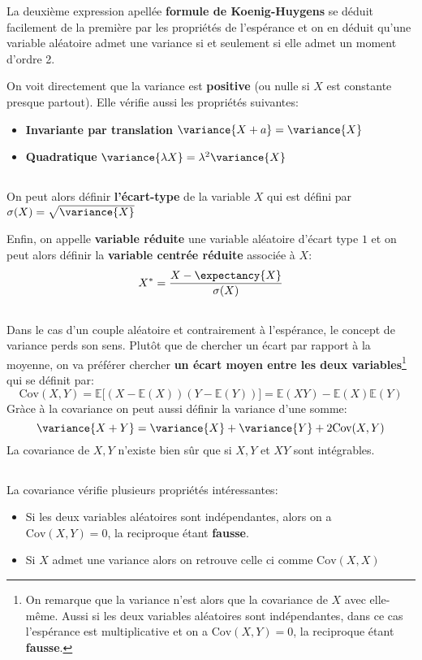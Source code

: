 La deuxième expression apellée \textbf{formule de Koenig-Huygens} se déduit facilement de la première par les propriétés de l'espérance et on en déduit qu'une variable aléatoire admet une variance si et seulement si elle admet un moment d'ordre 2.

On voit directement que la variance est \textbf{positive} (ou nulle si \(X\) est constante presque partout). Elle vérifie aussi les propriétés suivantes:
\begin{itemize}
   \item \textbf{Invariante par translation} \( \variance{X + a} = \variance{X} \)
   \item \textbf{Quadratique}  \( \variance{ \lambda X} = \lambda^2\variance{X} \)
\end{itemize}
\subsection*{}
On peut alors définir \textbf{l'écart-type} de la variable \(X\) qui est défini par \(\sigma(X) = \sqrt{\variance{X}}\)\<

Enfin, on appelle \textbf{variable réduite} une variable aléatoire d'écart type \(1\) et on peut alors définir la \textbf{variable centrée réduite} associée à \(X\):
\[
   X^*= \frac{X - \expectancy{X}}{\sigma(X)}  
\]
\subsection*{}
Dans le cas d'un couple aléatoire et contrairement à l'espérance, le concept de variance perds son sens. Plutôt que de chercher un écart par rapport à la moyenne, on va préférer chercher \textbf{un écart moyen entre les deux variables}\footnote[1]{On remarque que la variance n'est alors que la covariance de \(X\) avec elle-même. Aussi si les deux variables aléatoires sont indépendantes, dans ce cas l'espérance est multiplicative et on a \(\text{Cov}(X, Y) = 0\), la reciproque étant \textbf{fausse}.} qui se définit par:
\[
   \text{Cov}(X, Y) = \mathbb{E}\bigl[(X - \mathbb{E}(X))(Y - \mathbb{E}(Y))\bigl] = \mathbb{E}(XY) - \mathbb{E}(X)\mathbb{E}(Y) 
\]
Gràce à la covariance on peut aussi définir la variance d'une somme:
\[ 
   \variance{X + Y} =   \variance{X} + \variance{Y} +  2\text{Cov}(X, Y)
\]
La covariance de \( X, Y \) n'existe bien sûr que si \( X, Y \) et \( XY \) sont intégrables. 
\subsection*{}
La covariance vérifie plusieurs propriétés intéressantes:
\begin{itemize}
   \item Si les deux variables aléatoires sont indépendantes, alors on a \(\text{Cov}(X, Y) = 0\), la reciproque étant \textbf{fausse}.
   \item Si \( X \) admet une variance alors on retrouve celle ci comme \( \text{Cov}(X, X) \)
\end{itemize}

